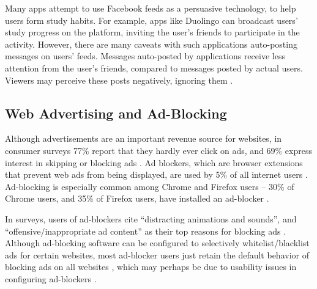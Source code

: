 \documentclass{sigchi}
\begin{document}
Many apps attempt to use Facebook feeds as a persuasive technology, to help users form study habits. For example, apps like Duolingo can broadcast users' study progress on the platform, inviting the user's friends to participate in the activity. However, there are many caveats with such applications auto-posting messages on users' feeds. Messages auto-posted by applications receive less attention from the user's friends, compared to messages posted by actual users. Viewers may perceive these posts negatively, ignoring them \cite{socialsharing}.

\pagebreak

\subsection{Web Advertising and Ad-Blocking}

Although advertisements are an important revenue source for websites, in consumer surveys 77\% report that they hardly ever click on ads, and 69\% express interest in skipping or blocking ads \cite{adblockinggames}. Ad blockers, which are browser extensions that prevent web ads from being displayed, are used by 5\% of all internet users \cite{adblockinggoesmainstream}. Ad-blocking is especially common among Chrome and Firefox users -- 30\% of Chrome users, and 35\% of Firefox users, have installed an ad-blocker \cite{adblockinggoesmainstream}. %

In surveys, users of ad-blockers cite ``distracting animations and sounds'', and ``offensive/inappropriate ad content'' as their top reasons for blocking ads \cite{adblockinggames}. Although ad-blocking software can be configured to selectively whitelist/blacklist ads for certain websites, most ad-blocker users just retain the default behavior of blocking ads on all websites \cite{adblockinggames}, which may perhaps be due to usability issues in configuring ad-blockers \cite{adblockusability}. %

\end{document}
